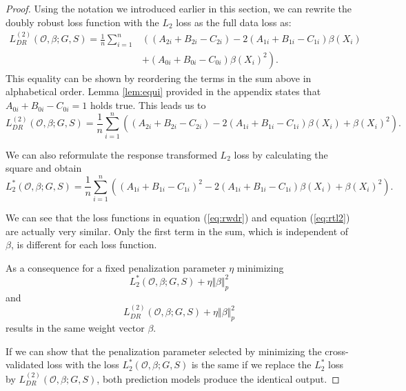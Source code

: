 \documentclass[12pt, a4paper]{article}
\theoremstyle{definition}
\theoremstyle{plain}
\numberwithin{equation}{section}
\numberwithin{figure}{section}
\numberwithin{table}{section}
\begin{document}
	\begin{proof}
		Using the notation we introduced earlier in this section, we can rewrite the doubly robust loss function with the $L_2$ loss as the full data loss as:
		\begin{equation}\label{eq:rwdr}
		\begin{split}
		L_{DR}^{(2)}(\mathcal{O}, \beta; G,S) = \frac{1}{n} \sum_{i=1}^n & \left((A_{2i}+B_{2i}-C_{2i}) - 2(A_{1i}+B_{1i}-C_{1i})\beta(X_i) \right.\\
		& \left.+ (A_{0i}+B_{0i}-C_{0i})\beta(X_i)^2\right).
		\end{split}
		\end{equation}
		This equality can be shown by reordering the terms in the sum above in alphabetical order.
		Lemma \ref{lem:equi} provided in the appendix states that $A_{0i}+B_{0i}-C_{0i} = 1$ holds true.
		This leads us to
		\begin{equation*}
		L_{DR}^{(2)}(\mathcal{O}, \beta; G,S) = \frac{1}{n} \sum_{i=1}^n  \left((A_{2i}+B_{2i}-C_{2i}) - 2(A_{1i}+B_{1i}-C_{1i})\beta(X_i) + \beta(X_i)^2\right).
		\end{equation*}
		
		We can also reformulate the response transformed $L_2$ loss by calculating the square and obtain
		\begin{equation}\label{eq:rtl2}
		L_2^*(\mathcal{O}, \beta; G,S) = \frac{1}{n} \sum_{i=1}^n \left((A_{1i}+B_{1i}-C_{1i})^2 - 2 (A_{1i}+B_{1i}-C_{1i}) \beta(X_i)+\beta(X_i)^2\right).
		\end{equation}
		
		We can see that the loss functions in equation (\ref{eq:rwdr}) and equation (\ref{eq:rtl2}) are actually very similar.
		Only the first term in the sum, which is independent of $\beta$, is different for each loss function.
	
		As a consequence for a fixed penalization parameter $\eta$ minimizing 
		\begin{equation*}
		L_2^*(\mathcal{O}, \beta; G,S) + \eta \Vert \beta \Vert_p^2
		\end{equation*}
		and 
		\begin{equation*}
		L_{DR}^{(2)}(\mathcal{O}, \beta; G,S) + \eta \Vert \beta \Vert_p^2
		\end{equation*}
		 results in the same weight vector $\beta$.
		 
		 If we can show that the penalization parameter selected by minimizing the cross-validated loss with the loss $L_2^*(\mathcal{O}, \beta; G,S)$ is the same if we replace the $L_2^*$ loss by $L_{DR}^{(2)}(\mathcal{O}, \beta; G,S)$, both prediction models produce the identical output.
		

\end{proof}
\end{document}
